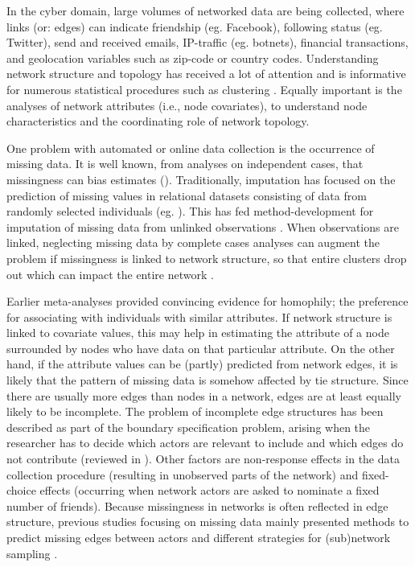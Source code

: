 \documentclass{article}
\begin{document}
In the cyber domain, large volumes of networked data are being collected, where links (or: edges) can indicate friendship (eg. Facebook), following status (eg. Twitter), send and received emails, IP-traffic (eg. botnets), financial transactions, and geolocation variables such as zip-code or country codes. Understanding network structure and topology has received a lot of attention and is informative for numerous statistical procedures such as clustering \cites{blondel2008fast, holland1983stochastic}. Equally important is the analyses of network attributes (i.e., node covariates), to understand node characteristics and the coordinating role of network topology.

One problem with automated or online data collection is the occurrence of missing data. It is well known, from analyses on independent cases, that missingness can bias estimates (\cites{little2019statistical, schafer2002missing}). Traditionally, imputation has focused on the prediction of missing values in relational datasets consisting of data from randomly selected individuals (eg. \cites{harel2007multiple, rezvan2015rise}). This has fed method-development for imputation of missing data from unlinked observations \cite{van2012flexible}. When observations are linked, neglecting missing data by complete cases analyses can augment the problem if missingness is linked to network structure, so that entire clusters drop out which can impact the entire network \cites{huisman2008treatment, hancock2007modeling}.

Earlier meta-analyses \cite{dittrich2017bayesian} provided convincing evidence for homophily; the preference for associating with individuals with similar attributes. If network structure is linked to covariate values, this may help in estimating the attribute of a node surrounded by nodes who have data on that particular attribute. On the other hand, if the attribute values can be (partly) predicted from network edges, it is likely that the pattern of missing data is somehow affected by tie structure. Since there are usually more edges than nodes in a network, edges are at least equally likely to be incomplete. The problem of incomplete edge structures has been described as part of the boundary specification problem, arising when the researcher has to decide which actors are relevant to include and which edges do not contribute (reviewed in \cite{kossinets2006effects}). Other factors are non-response effects in the data collection procedure (resulting in unobserved parts of the network) and fixed-choice effects (occurring when network actors are asked to nominate a fixed number of friends). Because missingness in networks is often reflected in edge structure, previous studies focusing on missing data mainly presented methods to predict missing edges between actors \cites{koskinen2013bayesian, huisman2009imputation} and different strategies for (sub)network sampling \cites{delahaye2017analytic, hipp2015research}.
\end{document}
